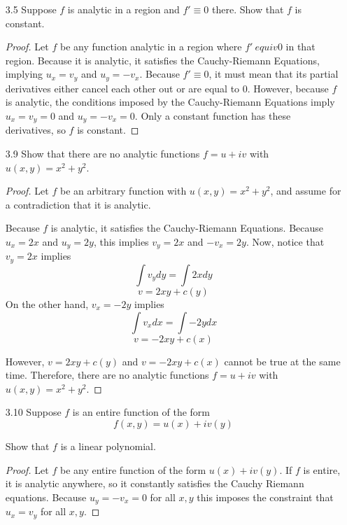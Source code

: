 \documentclass[11pt]{article}
\begin{document}
\begin{enumerate}
\begin{proof}
		Therefore, $f$ is analytic only on the line $x = y$. However, for $f$ to be analytic for any $z$, it must be analytic in a neighborhood of $z$. However, for any $z$ where $f$ is analytic, its neighborhood contains an infinite number of points where $x \neq y$. Therefore, $f$ is nowhere analytic.
	\end{proof}
	
	\item[3.5] Suppose $f$ is analytic in a region and $f' \equiv 0$ there. Show that $f$ is constant. 
	
	\begin{proof}
		Let $f$ be any function analytic in a region where $f' \ equiv 0$ in that region. Because it is analytic, it satisfies the Cauchy-Riemann Equations, implying $u_x = v_y$ and $u_y = -v_x$. Because $f' \equiv 0$, it must mean that its partial derivatives either cancel each other out or are equal to 0. However, because $f$ is analytic, the conditions imposed by the Cauchy-Riemann Equations imply $u_x = v_y = 0$ and $u_y = -v_x =0$. Only a constant function has these derivatives, so $f$ is constant.
	\end{proof}
	
	\item[3.9] Show that there are no analytic functions $f = u + iv$ with $u(x, y) = x^2 + y^2$. 
	
	\begin{proof}
		Let $f$ be an arbitrary function with $u(x, y) = x^2 + y^2$, and assume for a contradiction that it is analytic.
		
		\bigskip
		
		Because $f$ is analytic, it satisfies the Cauchy-Riemann Equations. Because $u_x = 2x$ and $u_y = 2y$, this implies $v_y = 2x$ and $-v_x = 2y$. Now, notice that $v_y = 2x$ implies 
		\[\int v_y dy = \int 2x dy\]
		\[v = 2xy + c(y) \]
		On the other hand, $v_x = -2y$ implies
		\[\int v_x dx = \int -2y dx \]
		\[v = -2xy + c(x)\]
		
		However, $v = 2xy + c(y)$ and $v = -2xy + c(x)$ cannot be true at the same time. Therefore, there are no analytic functions $f = u + iv$ with $u(x, y) = x^2 + y^2$.		
	\end{proof}
	
	\item[3.10] Suppose $f$ is an entire function of the form
		\[f(x, y) = u(x) + iv(y)\]
		
	Show that $f$ is a linear polynomial.
	
	\begin{proof}
		Let $f$ be any entire function of the form $u(x) + iv(y)$. If $f$ is entire, it is analytic anywhere, so it constantly satisfies the Cauchy Riemann equations. Because $u_y = -v_x = 0$ for all $x, y$ this imposes the constraint that $u_x = v_y$ for all $x, y$.
		

\end{proof}
\end{enumerate}
\end{document}
